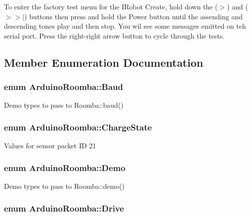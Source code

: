 To enter the factory test menu for the IRobot Create, hold down the ($>$) and ($>$$>$$|$) buttons then press and hold the Power button until the assending and descending tones play and then stop. You wil see some messages emitted on teh serial port. Press the right-\/right arrow button to cycle through the tests. 

\subsection{Member Enumeration Documentation}
\hypertarget{class_arduino_roomba_af609a2cdb5613e540d5858dd94defc52}{
\subsubsection[{Baud}]{\setlength{\rightskip}{0pt plus 5cm}enum {\bf ArduinoRoomba::Baud}}}
\label{class_arduino_roomba_af609a2cdb5613e540d5858dd94defc52}
Demo types to pass to Roomba::baud() \hypertarget{class_arduino_roomba_a25509a441bf3c60281aebab8797620ef}{
\subsubsection[{ChargeState}]{\setlength{\rightskip}{0pt plus 5cm}enum {\bf ArduinoRoomba::ChargeState}}}
\label{class_arduino_roomba_a25509a441bf3c60281aebab8797620ef}
Values for sensor packet ID 21 \hypertarget{class_arduino_roomba_a7c3cccf56b26a783de296211b9e6aa7a}{
\subsubsection[{Demo}]{\setlength{\rightskip}{0pt plus 5cm}enum {\bf ArduinoRoomba::Demo}}}
\label{class_arduino_roomba_a7c3cccf56b26a783de296211b9e6aa7a}
Demo types to pass to Roomba::demo() \hypertarget{class_arduino_roomba_af4798542a2feebafa4247d935bb2fb29}{
\subsubsection[{Drive}]{\setlength{\rightskip}{0pt plus 5cm}enum {\bf ArduinoRoomba::Drive}}}
\label{class_arduino_roomba_af4798542a2feebafa4247d935bb2fb29}
